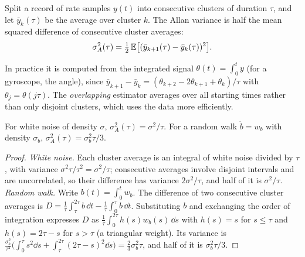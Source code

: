 \begin{definition}
Split a record of rate samples $y(t)$ into consecutive clusters of duration $\tau$, and let $\bar y_k(\tau)$ be the average over cluster $k$. The
Allan variance is half the mean squared difference of consecutive cluster averages:
\begin{equation}
  \sigma_A^2(\tau) = \tfrac12\,\mathbb{E}\big[(\bar y_{k+1}(\tau) - \bar y_k(\tau))^2\big] .
\end{equation}
\end{definition}

In practice it is computed from the integrated signal $\theta(t) = \int_0^ty$ (for a gyroscope, the angle), since
$\bar y_{k+1} - \bar y_k = (\theta_{k+2} - 2\theta_{k+1} + \theta_k)/\tau$ with $\theta_j = \theta(j\tau)$. The \emph{overlapping} estimator averages over all
starting times rather than only disjoint clusters, which uses the data more efficiently.

\begin{proposition}
For white noise of density $\sigma$, $\sigma_A^2(\tau) = \sigma^2/\tau$. For a random walk $\dot b = w_b$ with density $\sigma_b$, $\sigma_A^2(\tau) = \sigma_b^2\tau/3$.
\end{proposition}
\begin{proof}
\emph{White noise.} Each cluster average is an integral of white noise divided by $\tau$, with variance $\sigma^2\tau/\tau^2 = \sigma^2/\tau$; consecutive
averages involve disjoint intervals and are uncorrelated, so their difference has variance $2\sigma^2/\tau$, and half of it is $\sigma^2/\tau$.
\emph{Random walk.} Write $b(t) = \int_0^tw_b$. The difference of two consecutive cluster averages is
$D = \frac1\tau\int_\tau^{2\tau}b\,\dd t - \frac1\tau\int_0^\tau b\,\dd t$. Substituting $b$ and exchanging the order of integration expresses $D$ as
$\frac1\tau\int_0^{2\tau}h(s)w_b(s)\,\dd s$ with $h(s) = s$ for $s \le \tau$ and $h(s) = 2\tau - s$ for $s > \tau$ (a triangular weight). Its variance is
$\frac{\sigma_b^2}{\tau^2}\big(\int_0^\tau s^2\dd s + \int_\tau^{2\tau}(2\tau - s)^2\dd s\big) = \frac{2}{3}\sigma_b^2\tau$, and half of it is $\sigma_b^2\tau/3$.
\end{proof}

